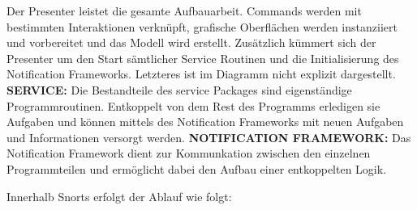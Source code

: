 Der Presenter leistet die gesamte Aufbauarbeit. Commands werden mit bestimmten Interaktionen verknüpft, grafische Oberflächen werden instanziiert und vorbereitet und das Modell wird erstellt. 
Zusätzlich kümmert sich der Presenter um den Start sämtlicher Service Routinen und die Initialisierung des Notification Frameworks. Letzteres ist im Diagramm nicht explizit dargestellt.\newline
 \newline
\textbf{SERVICE:}\newline
Die Bestandteile des service Packages sind eigenständige Programmroutinen. Entkoppelt von dem Rest des Programms erledigen sie Aufgaben und können mittels des Notification Frameworks mit neuen Aufgaben und Informationen versorgt werden.\newline
 \newline
\textbf{NOTIFICATION FRAMEWORK:}\newline
Das Notification Framework dient zur Kommunkation zwischen den einzelnen Programmteilen und ermöglicht dabei den Aufbau einer entkoppelten Logik.\newline
 \newline
 
Innerhalb Snorts erfolgt der Ablauf wie folgt: 
